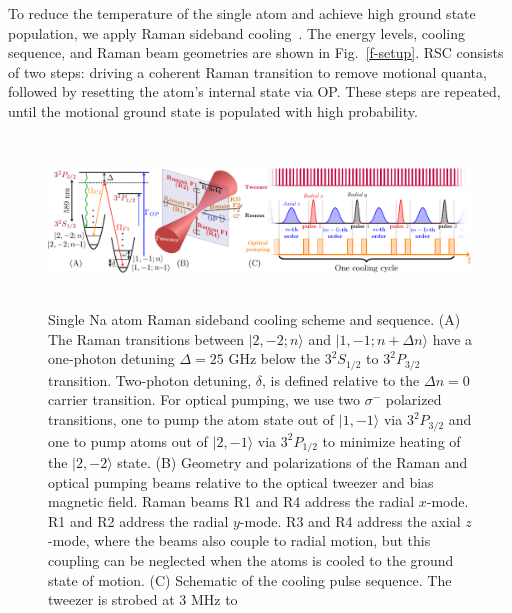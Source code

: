 \documentclass[aps,prl,twocolumn,groupedaddress]{revtex4-1}
\begin{document}
To reduce the temperature of the single atom and
 achieve high ground state population, we apply Raman sideband cooling~\cite{Monroe1995, Kaufman2012}.
The energy levels, cooling sequence, and Raman beam geometries
are shown in Fig.~\ref{f-setup}. RSC consists of two steps:
driving a coherent Raman transition to remove motional quanta, followed by resetting the atom's internal state via OP.
These steps are repeated, until the motional ground state is populated with high probability.

\begin{figure}
  \includegraphics[height=4.5cm]{fig1_combined.pdf}
  \caption{Single Na atom Raman sideband cooling scheme and sequence. (A)
    The Raman transitions between $|2,-2;n\rangle$ and $|1,-1;n+\Delta n\rangle$ have a one-photon detuning $\Delta=25$ GHz below the $3^2S_{1/2}$ to $3^2P_{3/2}$ transition. Two-photon detuning, $\delta$, is defined relative to the $\Delta n=0$ carrier transition. For optical pumping, we use two $\sigma^-$ polarized transitions, one to pump the atom state out of $|1,-1\rangle$ via $3^2P_{3/2}$ and one to pump atoms out of $|2,-1\rangle$ via $3^2P_{1/2}$
     to minimize heating of the $|2,-2\rangle$ state.
    (B) Geometry and polarizations of the Raman and optical pumping beams relative to the
    optical tweezer and bias magnetic field.  Raman beams R1 and R4 address the radial $x$-mode. R1 and R2 address the radial $y$-mode.  R3 and R4 address the axial $z$-mode, where the beams also couple to radial motion, but this coupling can be neglected when the atoms is cooled to the ground state of motion.  %
    (C) Schematic of the cooling pulse sequence. The tweezer is strobed at 3 MHz to
}
\end{figure}
\end{document}
